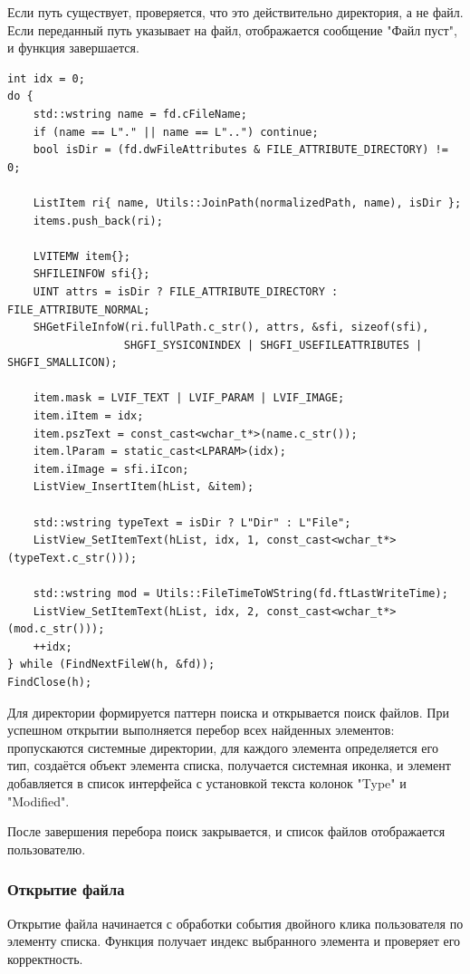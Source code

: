 Если путь существует, проверяется, что это действительно
директория, а не файл. Если переданный путь указывает на
файл, отображается сообщение "Файл пуст", и функция
завершается.

\begin{lstlisting}[style=CodeListing]
int idx = 0;
do {
    std::wstring name = fd.cFileName;
    if (name == L"." || name == L"..") continue;
    bool isDir = (fd.dwFileAttributes & FILE_ATTRIBUTE_DIRECTORY) != 0;

    ListItem ri{ name, Utils::JoinPath(normalizedPath, name), isDir };
    items.push_back(ri);

    LVITEMW item{};
    SHFILEINFOW sfi{};
    UINT attrs = isDir ? FILE_ATTRIBUTE_DIRECTORY : FILE_ATTRIBUTE_NORMAL;
    SHGetFileInfoW(ri.fullPath.c_str(), attrs, &sfi, sizeof(sfi), 
                  SHGFI_SYSICONINDEX | SHGFI_USEFILEATTRIBUTES | SHGFI_SMALLICON);

    item.mask = LVIF_TEXT | LVIF_PARAM | LVIF_IMAGE;
    item.iItem = idx;
    item.pszText = const_cast<wchar_t*>(name.c_str());
    item.lParam = static_cast<LPARAM>(idx);
    item.iImage = sfi.iIcon;
    ListView_InsertItem(hList, &item);

    std::wstring typeText = isDir ? L"Dir" : L"File";
    ListView_SetItemText(hList, idx, 1, const_cast<wchar_t*>(typeText.c_str()));

    std::wstring mod = Utils::FileTimeToWString(fd.ftLastWriteTime);
    ListView_SetItemText(hList, idx, 2, const_cast<wchar_t*>(mod.c_str()));
    ++idx;
} while (FindNextFileW(h, &fd));
FindClose(h);
\end{lstlisting}

Для директории формируется паттерн поиска и открывается
поиск файлов. При успешном открытии выполняется перебор
всех найденных элементов: пропускаются системные директории,
для каждого элемента определяется его тип, создаётся объект
элемента списка, получается системная иконка, и элемент
добавляется в список интерфейса с установкой текста колонок
"Type" и "Modified".

После завершения перебора поиск закрывается, и список файлов
отображается пользователю.

\subsubsection{Открытие файла}

Открытие файла начинается с обработки события двойного клика
пользователя по элементу списка. Функция получает индекс
выбранного элемента и проверяет его корректность.

